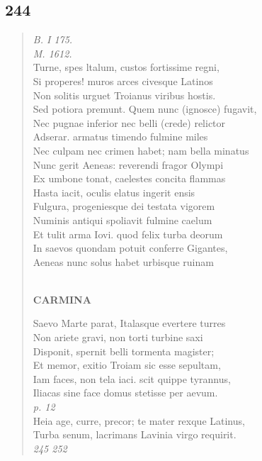 \documentclass[11pt, a4paper]{report}
\begin{document}
            \subsection*{244}
      \begin{verse}
      \textit{B. I 175.} \\ \textit{M. 1612.} \\ Turne, spes ltalum, custos fortissime regni, \\ Si properes! muros arces civesque Latinos \\ Non solitis urguet Troianus viribus hostis. \\ Sed potiora premunt. Quem nunc (ignosce) fugavit, \\ Nec pugnae inferior nec belli (crede) relictor \\ Adserar. armatus timendo fulmine miles \\ Nec culpam nec crimen habet; nam bella minatus \\ Nunc gerit Aeneas: reverendi fragor Olympi \\ Ex umbone tonat, caelestes concita flammas \\ Hasta iacit, oculis elatus ingerit ensis \\ Fulgura, progeniesque dei testata vigorem \\ Numinis antiqui spoliavit fulmine caelum \\ Et tulit arma Iovi. quod felix turba deorum \\ In saevos quondam potuit conferre Gigantes, \\ Aeneas nunc solus habet urbisque ruinam \\ 
        ﻿\pagebreak 
    \begin{center} \textbf{CARMINA} \end{center} \marginpar{[200]} Saevo Marte parat, Italasque evertere turres \\ Non ariete gravi, non torti turbine saxi \\ Disponit, spernit belli tormenta magister; \\ Et memor, exitio Troiam sic esse sepultam, \\ Iam faces, non tela iaci. scit quippe tyrannus, \\ Iliacas sine face domus stetisse per aevum. \\ \textit{p. 12} \\ Heia age, curre, precor; te mater rexque Latinus, \\ Turba senum, lacrimans Lavinia virgo requirit. \\ \textit{245 252} \\ 
      \end{verse}
  
\end{document}
